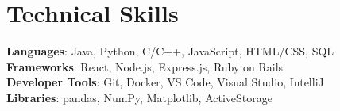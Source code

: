 \documentclass[letterpaper,11pt]{article}
\begin{document}
%
\section{Technical Skills}
 \begin{itemize}[leftmargin=0.15in, label={}]
    \small{\item{
     \textbf{Languages}{: Java, Python, C/C++, JavaScript, HTML/CSS, SQL} \\
     \textbf{Frameworks}{: React, Node.js, Express.js, Ruby on Rails} \\
     \textbf{Developer Tools}{: Git, Docker, VS Code, Visual Studio, IntelliJ} \\
     \textbf{Libraries}{: pandas, NumPy, Matplotlib, ActiveStorage}
    }}
 \end{itemize}


\end{document}

